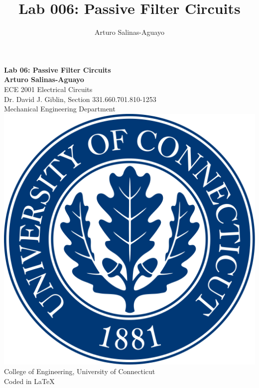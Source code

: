 \documentclass[12pt]{article}
\author{Arturo Salinas-Aguayo}
\title{Lab 006: Passive Filter Circuits}
\begin{document}
\newcommand{\closure}[2][3]{%
	{}\mkern#1mu\overline{\mkern-#1mu#2}}
\newcommand\ncoverline[1]{\mkern1mu\overline{\mkern-1mu#1\mkern-1mu}\mkern1mu}
\begin{titlepage}
	\centering
	\vspace*{3cm}
	\huge\textbf{Lab 06: Passive Filter Circuits}\\

	\vspace{5cm}
	\Large\textbf{Arturo Salinas-Aguayo}\\
	\normalsize
	ECE 2001 Electrical Circuits\\
	Dr. David J. Giblin, Section 331.660.701.810-1253\\
	Mechanical Engineering Department
	\vfill
	\includegraphics[scale=0.1]{uconnlogo}\\
	College of Engineering, University of Connecticut\\
	\scriptsize{Coded in \LaTeX}
	\vspace*{1cm}
\end{titlepage}
\tableofcontents
\newpage
\end{document}
